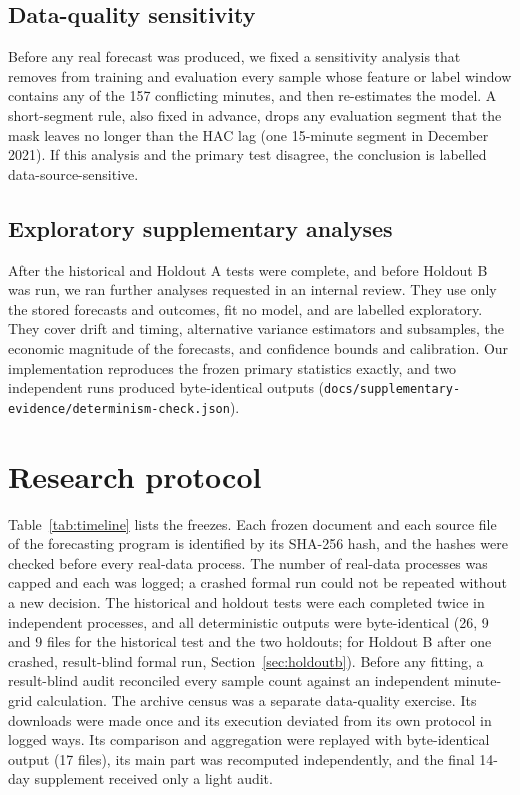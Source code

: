 \documentclass[11pt]{article}
\begin{document}
\subsection{Data-quality sensitivity}\label{sec:sdq}
Before any real forecast was produced, we fixed a sensitivity analysis that removes from training and evaluation every sample whose feature or label window contains any of the 157 conflicting minutes, and then re-estimates the model. A short-segment rule, also fixed in advance, drops any evaluation segment that the mask leaves no longer than the HAC lag (one 15-minute segment in December 2021). If this analysis and the primary test disagree, the conclusion is labelled data-source-sensitive.

\subsection{Exploratory supplementary analyses}
After the historical and Holdout A tests were complete, and before Holdout B was run, we ran further analyses requested in an internal review. They use only the stored forecasts and outcomes, fit no model, and are labelled exploratory. They cover drift and timing, alternative variance estimators and subsamples, the economic magnitude of the forecasts, and confidence bounds and calibration. Our implementation reproduces the frozen primary statistics exactly, and two independent runs produced byte-identical outputs (\nolinkurl{docs/supplementary-evidence/determinism-check.json}).

\section{Research protocol}

Table~\ref{tab:timeline} lists the freezes. Each frozen document and each source file of the forecasting program is identified by its SHA-256 hash, and the hashes were checked before every real-data process. The number of real-data processes was capped and each was logged; a crashed formal run could not be repeated without a new decision. The historical and holdout tests were each completed twice in independent processes, and all deterministic outputs were byte-identical (26, 9 and 9 files for the historical test and the two holdouts; for Holdout B after one crashed, result-blind formal run, Section~\ref{sec:holdoutb}). Before any fitting, a result-blind audit reconciled every sample count against an independent minute-grid calculation. The archive census was a separate data-quality exercise. Its downloads were made once and its execution deviated from its own protocol in logged ways. Its comparison and aggregation were replayed with byte-identical output (17 files), its main part was recomputed independently, and the final 14-day supplement received only a light audit.
\end{document}
